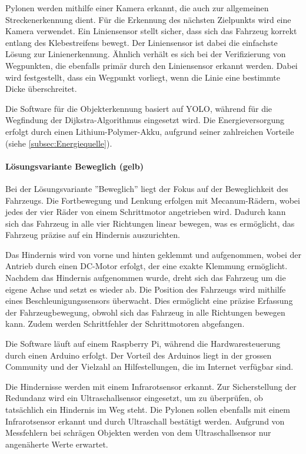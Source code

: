 \documentclass[../main.tex]{subfiles}
\begin{document}
    Pylonen werden mithilfe einer Kamera erkannt, die auch zur allgemeinen Streckenerkennung dient. Für die Erkennung des nächsten Zielpunkts wird eine Kamera verwendet. Ein Liniensensor stellt sicher, dass sich das Fahrzeug korrekt entlang des Klebestreifens bewegt. Der Liniensensor ist dabei die einfachste Lösung zur Linienerkennung. Ähnlich verhält es sich bei der Verifizierung von Wegpunkten, die ebenfalls primär durch den Liniensensor erkannt werden. Dabei wird festgestellt, dass ein Wegpunkt vorliegt, wenn die Linie eine bestimmte Dicke überschreitet. 

    Die Software für die Objekterkennung basiert auf YOLO, während für die Wegfindung der Dijkstra-Algorithmus eingesetzt wird. Die Energieversorgung erfolgt durch einen Lithium-Polymer-Akku, aufgrund seiner zahlreichen Vorteile (siehe \ref{subsec:Energiequelle}).
    
    \newpage
    
    \paragraph{Lösungsvariante Beweglich (gelb)}
    Bei der Lösungsvariante ''Beweglich'' liegt der Fokus auf der Beweglichkeit des Fahrzeugs. Die Fortbewegung und Lenkung erfolgen mit Mecanum-Rädern, wobei jedes der vier Räder von einem Schrittmotor angetrieben wird. Dadurch kann sich das Fahrzeug in alle vier Richtungen linear bewegen, was es ermöglicht, das Fahrzeug präzise auf ein Hindernis auszurichten.

    Das Hindernis wird von vorne und hinten geklemmt und aufgenommen, wobei der Antrieb durch einen DC-Motor erfolgt, der eine exakte Klemmung ermöglicht. Nachdem das Hindernis aufgenommen wurde, dreht sich das Fahrzeug um die eigene Achse und setzt es wieder ab. Die Position des Fahrzeugs wird mithilfe eines Beschleunigungssensors überwacht. Dies ermöglicht eine präzise Erfassung der Fahrzeugbewegung, obwohl sich das Fahrzeug in alle Richtungen bewegen kann. Zudem werden Schrittfehler der Schrittmotoren abgefangen.

    Die Software läuft auf einem Raspberry Pi, während die Hardwaresteuerung durch einen Arduino erfolgt. Der Vorteil des Arduinos liegt in der grossen Community und der Vielzahl an Hilfestellungen, die im Internet verfügbar sind.

    Die Hindernisse werden mit einem Infrarotsensor erkannt. Zur Sicherstellung der Redundanz wird ein Ultraschallsensor eingesetzt, um zu überprüfen, ob tatsächlich ein Hindernis im Weg steht. Die Pylonen sollen ebenfalls mit einem Infrarotsensor erkannt und durch Ultraschall bestätigt werden. Aufgrund von Messfehlern bei schrägen Objekten werden von dem Ultraschallsensor nur angenäherte Werte erwartet.
\end{document}
